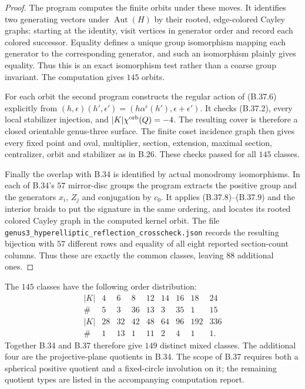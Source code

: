 \begin{proof}
The program computes the finite orbits under these moves.  It
identifies two generating vectors under $\operatorname{Aut}(H)$ by
their rooted, edge-colored Cayley graphs: starting at the identity,
visit vertices in generator order and record each colored successor.
Equality defines a unique group isomorphism mapping each generator
to the corresponding generator, and such an isomorphism plainly
gives equality.  Thus this is an exact isomorphism test rather than
a coarse group invariant.  The computation gives $145$ orbits.

For each orbit the second program constructs the regular action of
(B.37.6) explicitly from
$(h,\epsilon)(h',\epsilon')=(h\alpha^\epsilon(h'),\epsilon+\epsilon')$.
It checks (B.37.2), every local stabilizer injection, and
$|K|\chi^{\rm orb}(Q)=-4$.  The resulting cover is therefore a closed
orientable genus-three surface.  The finite coset incidence graph
then gives every fixed point and oval, multiplier, section,
extension, maximal section, centralizer, orbit and stabilizer as in
B.26.  These checks passed for all $145$ classes.

Finally the overlap with B.34 is identified by actual monodromy
isomorphisms.  In each of B.34's $57$ mirror-disc groups the program
extracts the positive group and the generators $x_i$, $Z_j$ and
conjugation by $c_0$.  It applies (B.37.8)--(B.37.9) and the interior
braids to put the signature in the same ordering, and locates its
rooted colored Cayley graph in the computed kernel orbit.  The file
\texttt{genus3\_hyperelliptic\_reflection\_crosscheck.json} records
the resulting bijection with $57$ different rows and equality of
all eight reported section-count columns.  Thus these are exactly
the common classes, leaving $88$ additional ones.
\end{proof}

The $145$ classes have the following order distribution:
\[
\begin{array}{c|rrrrrrrr}
 |K|&4&6&8&12&14&16&18&24\\\hline
 \#&5&3&36&13&3&35&1&15\\[2pt]
 |K|&28&32&42&48&64&96&192&336\\\hline
 \#&1&13&1&11&2&4&1&1.
\end{array}                                             \tag{B.37.10}
\]
Together B.34 and B.37 therefore give $149$ distinct mixed classes.
The additional four are the projective-plane quotients in B.34.
The scope of B.37 requires both a spherical positive quotient and a
fixed-circle involution on it; the remaining quotient types are
listed in the accompanying computation report.
